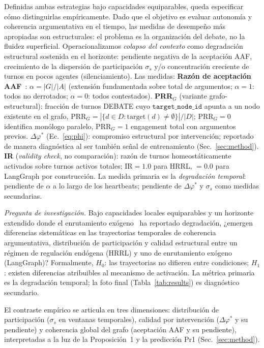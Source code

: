 \documentclass{llncs}
\begin{document}
Definidas ambas estrategias bajo capacidades equiparables, queda
especificar c\'omo distinguirlas emp\'iricamente. Dado que el objetivo
es evaluar autonom\'ia y coherencia argumentativa en el tiempo, las
medidas de desempe\~no m\'as apropiadas son estructurales:
el problema es la organizaci\'on del debate, no la fluidez superficial.
Operacionalizamos \emph{colapso del contexto} como degradaci\'on
estructural sostenida en el horizonte: pendiente negativa de la
aceptaci\'on AAF, crecimiento de la dispersi\'on de participaci\'on
$\sigma_s$ y/o concentraci\'on creciente de turnos en pocos agentes
(silenciamiento). Las medidas:
\textbf{Raz\'on de aceptaci\'on AAF}~\parencite{dung1995acceptability}:
$\alpha = \lvert G \rvert / \lvert A \rvert$ (extensi\'on fundamentada sobre
total de argumentos; $\alpha{=}1$: todos no derrotados; $\alpha{=}0$: todos
contestados). \textbf{PRR$_G$} (variante grafo-estructural): fracci\'on de
turnos DEBATE cuyo $\texttt{target\_node\_id}$ apunta a un nodo existente
en el grafo, $\mathrm{PRR}_G = |\{d \in D : \text{target}(d)\neq\emptyset\}|/|D|$;
$\mathrm{PRR}_G = 0$ identifica mon\'ologo paralelo,
$\mathrm{PRR}_G = 1$ engagement total con argumentos previos.
\textbf{$\Delta\varphi^*$} (Ec.~\ref{eq:phi}): compromiso estructural
por intervenci\'on; reportado de manera diagn\'ostica al ser tambi\'en
se\~nal de entrenamiento (Sec.~\ref{sec:method}). \textbf{IR}
(\emph{validity check}, no comparaci\'on): raz\'on de turnos
homeost\'aticamente activados sobre turnos activos totales; IR${=}1.0$
para HRRL, ${=}0.0$ para LangGraph por construcci\'on. La medida
primaria es la \emph{degradaci\'on temporal}: pendiente de $\alpha$ a
lo largo de los heartbeats; pendiente de $\Delta\varphi^*$ y $\sigma_s$
como medidas secundarias.

\emph{Pregunta de investigaci\'on.} Bajo capacidades locales equiparables
y un horizonte extendido donde el enrutamiento
ex\'ogeno~\parencite{snell2024scaling} ha reportado degradaci\'on,
¿emergen diferencias sistem\'aticas en las trayectorias temporales
de coherencia argumentativa, distribuci\'on de participaci\'on y
calidad estructural entre un r\'egimen de regulaci\'on end\'ogena (HRRL)
y uno de enrutamiento ex\'ogeno (LangGraph)? Formalmente, $H_0$: las
trayectorias no difieren entre condiciones; $H_1$: existen diferencias
atribuibles al mecanismo de activaci\'on. La m\'etrica primaria es la
degradaci\'on temporal; la foto final (Tabla~\ref{tab:results}) es
diagn\'ostico secundario.

El contraste emp\'irico se articula en tres dimensiones: distribuci\'on
de participaci\'on ($\sigma_s$ en ventanas temporales), calidad por
intervenci\'on ($\Delta\varphi^*$ y su pendiente) y coherencia global
del grafo (aceptaci\'on AAF y su pendiente), interpretadas a la luz de
la Proposici\'on~1 y la predicci\'on Pr1 (Sec.~\ref{sec:method}).
\end{document}
